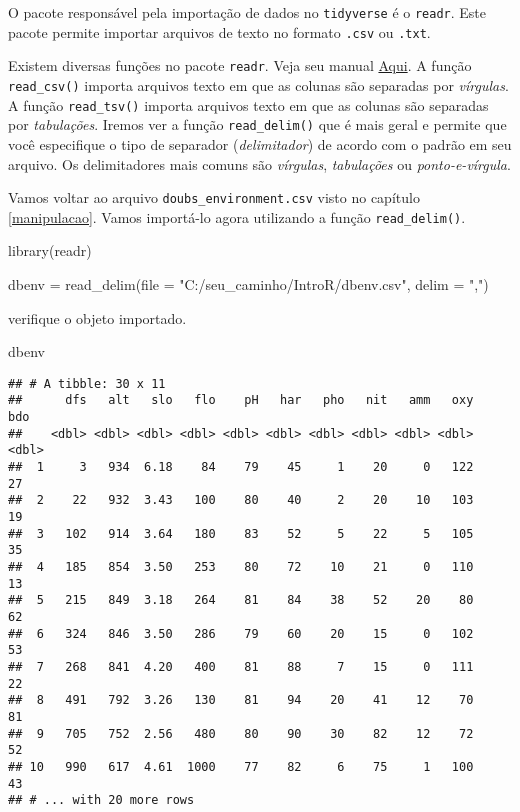 \documentclass[
]{book}
\newenvironment{Shaded}{\begin{snugshade}}{\end{snugshade}}
\newcommand{\AttributeTok}[1]{\textcolor[rgb]{0.77,0.63,0.00}{#1}}
\newcommand{\FunctionTok}[1]{\textcolor[rgb]{0.00,0.00,0.00}{#1}}
\newcommand{\NormalTok}[1]{#1}
\newcommand{\OtherTok}[1]{\textcolor[rgb]{0.56,0.35,0.01}{#1}}
\newcommand{\StringTok}[1]{\textcolor[rgb]{0.31,0.60,0.02}{#1}}
\begin{document}
O pacote responsável pela importação de dados no \texttt{tidyverse} é o \texttt{readr}. Este pacote permite importar arquivos de texto no formato \texttt{.csv} ou \texttt{.txt}.

Existem diversas funções no pacote \texttt{readr}. Veja seu manual \href{https://cran.r-project.org/web/packages/readr/index.html}{Aqui}. A função \texttt{read\_csv()} importa arquivos texto em que as colunas são separadas por \emph{vírgulas}. A função \texttt{read\_tsv()} importa arquivos texto em que as colunas são separadas por \emph{tabulações}. Iremos ver a função \texttt{read\_delim()} que é mais geral e permite que você especifique o tipo de separador (\emph{delimitador}) de acordo com o padrão em seu arquivo. Os delimitadores mais comuns são \emph{vírgulas}, \emph{tabulações} ou \emph{ponto-e-vírgula}.

Vamos voltar ao arquivo \texttt{doubs\_environment.csv} visto no capítulo \ref{manipulacao}. Vamos importá-lo agora utilizando a função \texttt{read\_delim()}.

\begin{Shaded}
\begin{Highlighting}[]
\FunctionTok{library}\NormalTok{(readr)}
\end{Highlighting}
\end{Shaded}

\begin{Shaded}
\begin{Highlighting}[]
\NormalTok{dbenv }\OtherTok{=} \FunctionTok{read\_delim}\NormalTok{(}\AttributeTok{file =} \StringTok{"C:/seu\_caminho/IntroR/dbenv.csv"}\NormalTok{, }\AttributeTok{delim =} \StringTok{","}\NormalTok{)}
\end{Highlighting}
\end{Shaded}

verifique o objeto importado.

\begin{Shaded}
\begin{Highlighting}[]
\NormalTok{dbenv}
\end{Highlighting}
\end{Shaded}

\begin{verbatim}
## # A tibble: 30 x 11
##      dfs   alt   slo   flo    pH   har   pho   nit   amm   oxy   bdo
##    <dbl> <dbl> <dbl> <dbl> <dbl> <dbl> <dbl> <dbl> <dbl> <dbl> <dbl>
##  1     3   934  6.18    84    79    45     1    20     0   122    27
##  2    22   932  3.43   100    80    40     2    20    10   103    19
##  3   102   914  3.64   180    83    52     5    22     5   105    35
##  4   185   854  3.50   253    80    72    10    21     0   110    13
##  5   215   849  3.18   264    81    84    38    52    20    80    62
##  6   324   846  3.50   286    79    60    20    15     0   102    53
##  7   268   841  4.20   400    81    88     7    15     0   111    22
##  8   491   792  3.26   130    81    94    20    41    12    70    81
##  9   705   752  2.56   480    80    90    30    82    12    72    52
## 10   990   617  4.61  1000    77    82     6    75     1   100    43
## # ... with 20 more rows
\end{verbatim}
\end{document}
